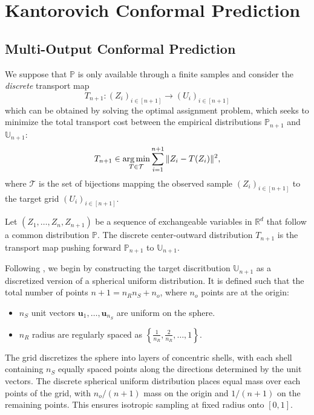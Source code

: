 \section{Kantorovich Conformal Prediction }

\subsection{Multi-Output Conformal Prediction}
We suppose that $\mathbb{P}$ is only available through a finite samples and consider the \textit{discrete} transport map
$$
T_{n+1} : (Z_i)_{i \in [n+1]} \to (U_i)_{i \in [n+1]}
$$
which can be obtained by solving the optimal assignment problem, which seeks to minimize the total transport cost between the empirical distributions $\mathbb{P}_{n+1}$ and $\mathbb{U}_{n+1}$:
\begin{equation}\label{eq:empirical_transport_map}
T_{n+1} \in \mathop{\mathrm{arg\,min}}_{T \in \mathcal{T}} \sum_{i=1}^{n+1} \|Z_i - T(Z_i)\|^2,
\end{equation}
where $\mathcal{T}$ is the set of bijections mapping the observed sample $(Z_i)_{i \in [n+1]}$ to the target grid $(U_i)_{i \in [n+1]}$. 

\begin{definition}    
    Let $(Z_1, \ldots, Z_n, Z_{n+1})$ be a sequence of exchangeable variables in $\mathbb{R}^d$ that follow a common distribution $\mathbb{P}$. The discrete center-outward distribution $T_{n+1}$ is the transport map pushing forward $\mathbb{P}_{n+1}$ to $\mathbb{U}_{n+1}$.
\end{definition}

Following \cite{hallin2021}, we begin by constructing the target discritbution $\mathbb{U}_{n+1}$ as a discretized version of a spherical uniform distribution. It is defined such that the total number of points $n + 1 = n_R n_S + n_o$, where $n_o$ points are at the origin:
\begin{itemize}
    \item $n_S$ unit vectors $\mathbf{u}_1, \ldots, \mathbf{u}_{n_S}$ are uniform on the sphere.
    \item $n_R$ radius are regularly spaced as $\left\{\frac{1}{n_R}, \frac{2}{n_R}, \ldots, 1\right\}$.
\end{itemize}
The grid discretizes the sphere into layers of concentric shells, with each shell containing $n_S$ equally spaced points along the directions determined by the unit vectors. The discrete spherical uniform distribution places equal mass over each points of the grid, with $n_o/(n+1)$ mass on the origin and $1/(n+1)$ on the remaining points.
This ensures isotropic sampling at fixed radius onto $[0,1]$.

